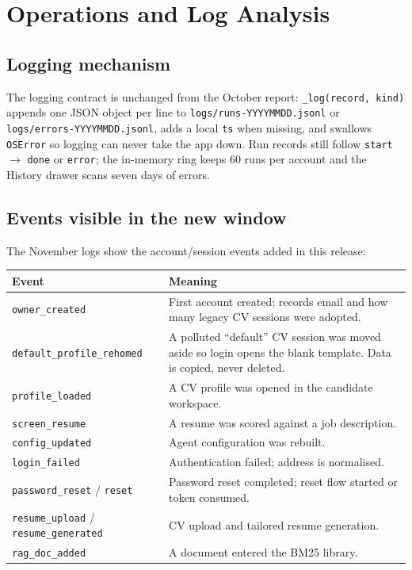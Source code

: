 \documentclass[11pt,a4paper]{article}
\newcommand{\file}[1]{\texttt{\small #1}}
\newcommand{\code}[1]{\texttt{#1}}
\begin{document}
\section{Operations and Log Analysis}
\label{u:ops}

\subsection{Logging mechanism}
The logging contract is unchanged from the October report:
\code{\_log(record, kind)} appends one JSON object per line to
\file{logs/runs-YYYYMMDD.jsonl} or \file{logs/errors-YYYYMMDD.jsonl}, adds a
local \code{ts} when missing, and swallows \code{OSError} so logging can never
take the app down. Run records still follow
\code{start} $\rightarrow$ \code{done} or \code{error}; the in-memory ring
keeps 60 runs per account and the History drawer scans seven days of errors.

\subsection{Events visible in the new window}
The November logs show the account/session events added in this release:
\begin{center}
\begin{tabular}{@{}lp{10.5cm}@{}}
\toprule
\textbf{Event} & \textbf{Meaning}\\
\midrule
\code{owner\_created} & First account created; records email and how many
  legacy CV sessions were adopted.\\
\code{default\_profile\_rehomed} & A polluted ``default'' CV session was moved
  aside so login opens the blank template. Data is copied, never deleted.\\
\code{profile\_loaded} & A CV profile was opened in the candidate workspace.\\
\code{screen\_resume} & A resume was scored against a job description.\\
\code{config\_updated} & Agent configuration was rebuilt.\\
\code{login\_failed} & Authentication failed; address is normalised.\\
\code{password\_reset} / \code{reset} & Password reset completed; reset flow
  started or token consumed.\\
\code{resume\_upload} / \code{resume\_generated} & CV upload and tailored
  resume generation.\\
\code{rag\_doc\_added} & A document entered the BM25 library.\\
\bottomrule
\end{tabular}
\end{center}
\end{document}
